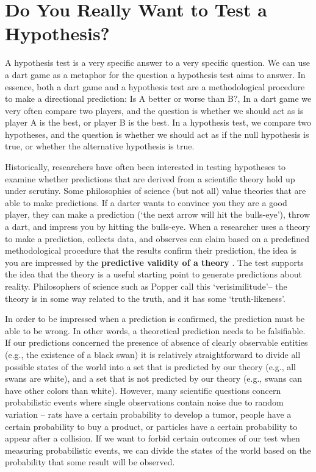 \documentclass[
  oneside]{book}
\begin{document}
\hypertarget{do-you-really-want-to-test-a-hypothesis}{%
\section{Do You Really Want to Test a Hypothesis?}\label{do-you-really-want-to-test-a-hypothesis}}

A hypothesis test is a very specific answer to a very specific question. We can use a dart game as a metaphor for the question a hypothesis test aims to answer. In essence, both a dart game and a hypothesis test are a methodological procedure to make a directional prediction: Is A better or worse than B?, In a dart game we very often compare two players, and the question is whether we should act as is player A is the best, or player B is the best. In a hypothesis test, we compare two hypotheses, and the question is whether we should act as if the null hypothesis is true, or whether the alternative hypothesis is true.

Historically, researchers have often been interested in testing hypotheses to examine whether predictions that are derived from a scientific theory hold up under scrutiny. Some philosophies of science (but not all) value theories that are able to make predictions. If a darter wants to convince you they are a good player, they can make a prediction (`the next arrow will hit the bulls-eye'), throw a dart, and impress you by hitting the bulls-eye. When a researcher uses a theory to make a prediction, collects data, and observes can claim based on a predefined methodological procedure that the results confirm their prediction, the idea is you are impressed by the \textbf{predictive validity of a theory} \citep{de_groot_methodology_1969}. The test supports the idea that the theory is a useful starting point to generate predictions about reality. Philosophers of science such as Popper call this `verisimilitude'-- the theory is in some way related to the truth, and it has some `truth-likeness'.

In order to be impressed when a prediction is confirmed, the prediction must be able to be wrong. In other words, a theoretical prediction needs to be falsifiable. If our predictions concerned the presence of absence of clearly observable entities (e.g., the existence of a black swan) it is relatively straightforward to divide all possible states of the world into a set that is predicted by our theory (e.g., all swans are white), and a set that is not predicted by our theory (e.g., swans can have other colors than white). However, many scientific questions concern probabilistic events where single observations contain noise due to random variation -- rats have a certain probability to develop a tumor, people have a certain probability to buy a product, or particles have a certain probability to appear after a collision. If we want to forbid certain outcomes of our test when measuring probabilistic events, we can divide the states of the world based on the probability that some result will be observed.
\end{document}
